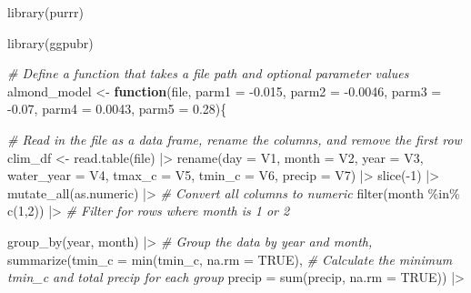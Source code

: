 \documentclass[
]{article}
\newenvironment{Shaded}{\begin{snugshade}}{\end{snugshade}}
\newcommand{\AttributeTok}[1]{\textcolor[rgb]{0.77,0.63,0.00}{#1}}
\newcommand{\CommentTok}[1]{\textcolor[rgb]{0.56,0.35,0.01}{\textit{#1}}}
\newcommand{\ConstantTok}[1]{\textcolor[rgb]{0.00,0.00,0.00}{#1}}
\newcommand{\ControlFlowTok}[1]{\textcolor[rgb]{0.13,0.29,0.53}{\textbf{#1}}}
\newcommand{\DecValTok}[1]{\textcolor[rgb]{0.00,0.00,0.81}{#1}}
\newcommand{\FloatTok}[1]{\textcolor[rgb]{0.00,0.00,0.81}{#1}}
\newcommand{\FunctionTok}[1]{\textcolor[rgb]{0.00,0.00,0.00}{#1}}
\newcommand{\NormalTok}[1]{#1}
\newcommand{\OtherTok}[1]{\textcolor[rgb]{0.56,0.35,0.01}{#1}}
\newcommand{\SpecialCharTok}[1]{\textcolor[rgb]{0.00,0.00,0.00}{#1}}
\begin{document}
\begin{Shaded}
\begin{Highlighting}[]
\FunctionTok{library}\NormalTok{(purrr)}

\FunctionTok{library}\NormalTok{(ggpubr)}
\end{Highlighting}
\end{Shaded}

\begin{Shaded}
\begin{Highlighting}[]
\CommentTok{\# Define a function that takes a file path and optional parameter values}
\NormalTok{almond\_model }\OtherTok{\textless{}{-}} \ControlFlowTok{function}\NormalTok{(file, }\AttributeTok{parm1 =} \SpecialCharTok{{-}}\FloatTok{0.015}\NormalTok{, }\AttributeTok{parm2 =} \SpecialCharTok{{-}}\FloatTok{0.0046}\NormalTok{, }\AttributeTok{parm3 =} \SpecialCharTok{{-}}\FloatTok{0.07}\NormalTok{, }\AttributeTok{parm4 =} \FloatTok{0.0043}\NormalTok{, }\AttributeTok{parm5 =} \FloatTok{0.28}\NormalTok{)\{}
  
  \CommentTok{\# Read in the file as a data frame, rename the columns, and remove the first row}
\NormalTok{  clim\_df }\OtherTok{\textless{}{-}} \FunctionTok{read.table}\NormalTok{(file) }\SpecialCharTok{|\textgreater{}} 
  \FunctionTok{rename}\NormalTok{(}\AttributeTok{day =}\NormalTok{ V1, }\AttributeTok{month =}\NormalTok{ V2, }\AttributeTok{year =}\NormalTok{ V3, }\AttributeTok{water\_year =}\NormalTok{ V4, }\AttributeTok{tmax\_c =}\NormalTok{ V5, }\AttributeTok{tmin\_c =}\NormalTok{ V6, }\AttributeTok{precip =}\NormalTok{ V7) }\SpecialCharTok{|\textgreater{}} 
  \FunctionTok{slice}\NormalTok{(}\SpecialCharTok{{-}}\DecValTok{1}\NormalTok{) }\SpecialCharTok{|\textgreater{}} 
    \FunctionTok{mutate\_all}\NormalTok{(as.numeric) }\SpecialCharTok{|\textgreater{}} \CommentTok{\# Convert all columns to numeric}
    \FunctionTok{filter}\NormalTok{(month }\SpecialCharTok{\%in\%} \FunctionTok{c}\NormalTok{(}\DecValTok{1}\NormalTok{,}\DecValTok{2}\NormalTok{)) }\SpecialCharTok{|\textgreater{}} \CommentTok{\# Filter for rows where month is 1 or 2}
    
    \FunctionTok{group\_by}\NormalTok{(year, month) }\SpecialCharTok{|\textgreater{}} \CommentTok{\# Group the data by year and month,}
    \FunctionTok{summarize}\NormalTok{(}\AttributeTok{tmin\_c =} \FunctionTok{min}\NormalTok{(tmin\_c, }\AttributeTok{na.rm =} \ConstantTok{TRUE}\NormalTok{), }\CommentTok{\# Calculate the minimum tmin\_c and total precip for each group}
              \AttributeTok{precip =} \FunctionTok{sum}\NormalTok{(precip, }\AttributeTok{na.rm =} \ConstantTok{TRUE}\NormalTok{)) }\SpecialCharTok{|\textgreater{}} 
    

\end{Highlighting}
\end{Shaded}
\end{document}
